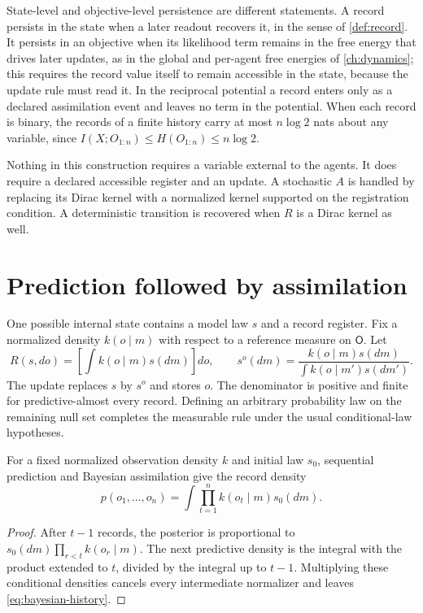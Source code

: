 State-level and objective-level persistence are different statements. A record persists in the state when a later readout recovers it, in the sense of \cref{def:record}. It persists in an objective when its likelihood term remains in the free energy that drives later updates, as in the global and per-agent free energies of \cref{ch:dynamics}; this requires the record value itself to remain accessible in the state, because the update rule must read it. In the reciprocal potential a record enters only as a declared assimilation event and leaves no term in the potential. When each record is binary, the records of a finite history carry at most $n\log2$ nats about any variable, since $I(X;O_{1:n})\leq H(O_{1:n})\leq n\log2$.

Nothing in this construction requires a variable external to the agents. It does require a declared accessible register and an update. A stochastic $A$ is handled by replacing its Dirac kernel with a normalized kernel supported on the registration condition. A deterministic transition is recovered when $R$ is a Dirac kernel as well.

\section{Prediction followed by assimilation}

One possible internal state contains a model law $s$ and a record register. Fix a normalized density $k(o\mid m)$ with respect to a reference measure on $\mathsf O$. Let
\begin{equation}
R(s,do)=\left[\int k(o\mid m)s(dm)\right]do,
\qquad
s^o(dm)=\frac{k(o\mid m)s(dm)}{\int k(o\mid m')s(dm')}.
\label{eq:predict-and-assimilate}
\end{equation}
The update replaces $s$ by $s^o$ and stores $o$. The denominator is positive and finite for predictive-almost every record. Defining an arbitrary probability law on the remaining null set completes the measurable rule under the usual conditional-law hypotheses.

For a fixed normalized observation density $k$ and initial law $s_0$, sequential prediction and Bayesian assimilation give the record density
\begin{equation}
p(o_1,\ldots,o_n)
=\int\prod_{t=1}^n k(o_t\mid m)s_0(dm).
\label{eq:bayesian-history}
\end{equation}
\begin{proof}
After $t-1$ records, the posterior is proportional to $s_0(dm)\prod_{r<t}k(o_r\mid m)$. The next predictive density is the integral with the product extended to $t$, divided by the integral up to $t-1$. Multiplying these conditional densities cancels every intermediate normalizer and leaves \cref{eq:bayesian-history}.
\end{proof}

